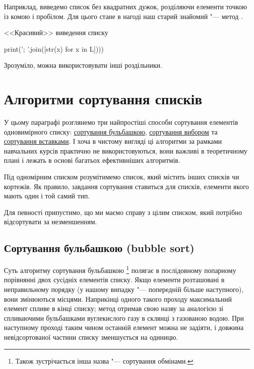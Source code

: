 Наприклад, виведемо список без квадратних дужок, розділяючи елементи точкою із комою і пробілом. Для цього стане в нагоді наш старий знайомий "--- метод .

\begin{defn}{<<Красивий>> виведення списку}
\begin{py}{}
print('; '.join([str(x) for x in L])))
\end{py}
\end{defn}

Зрозуміло, можна використовувати інші роздільники.


\section{Алгоритми сортування списків}\label{sort}

У цьому параграфі розглянемо три найпростіші способи сортування елементів одновимірного списку: \hyperref [bubble]{сортування бульбашкою}, \hyperref [selection]{сортування вибором} та \hyperref [insertion]{сортування вставками}. І хоча в чистому вигляді ці алгоритми за рамками навчальних курсів практично не використовуються, вони важливі в теоретичному плані і лежать в основі багатьох ефективніших алгоритмів.

Під одномірним списком розумітимемо список, який містить інших списків чи кортежів. Як правило, завдання сортування ставиться для списків, елементи якого мають один і той самий тип.

Для певності припустимо, що ми маємо справу з цілим списком, який потрібно відсортувати за незменшенням.

\subsection{Сортування бульбашкою (bubble sort)}\label{bubble}

Суть алгоритму сортування бульбашкою \footnote{Також зустрічається інша назва "--- сортування обмінами.} полягає в послідовному попарному порівнянні двох сусідніх елементів списку. Якщо елементи розташовані в неправильному порядку (у нашому випадку "--- попередній більше наступного), вони змінюються місцями. Наприкінці одного такого проходу максимальний елемент спливе в кінці списку; метод отримав свою назву за аналогією зі спливаючими бульбашками вуглекислого газу в склянці з газованою водою. При наступному проході таким чином останній елемент можна не задіяти, і довжина невідсортованої частини списку зменшується на одиницю.


